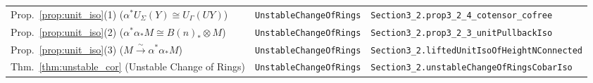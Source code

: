 \documentclass[11pt,reqno]{amsart}
\theoremstyle{plain}
\theoremstyle{definition}
\begin{document}
{\begin{longtable}{@{}p{}p{}p{}@{}}
Prop.~\ref{prop:unit_iso}(1) ($\alpha^* U_{\Sigma}(Y) \cong U_{\Gamma}(UY)$) & \texttt{UnstableChangeOfRings} & \texttt{Section3\_2.prop3\_2\_4\_cotensor\_cofree} \\
Prop.~\ref{prop:unit_iso}(2) ($\alpha^*\alpha_* M \cong B(n)_* \otimes M$) & \texttt{UnstableChangeOfRings} & \texttt{Section3\_2.prop3\_2\_3\_unitPullbackIso} \\
Prop.~\ref{prop:unit_iso}(3) ($M \xrightarrow{\sim} \alpha^*\alpha_* M$) & \texttt{UnstableChangeOfRings} & \texttt{Section3\_2.liftedUnitIsoOfHeightNConnected} \\
Thm.~\ref{thm:unstable_cor} (Unstable Change of Rings) & \texttt{UnstableChangeOfRings} & \texttt{Section3\_2.unstableChangeOfRingsCobarIso} \\
\end{longtable}
}



\end{document}
